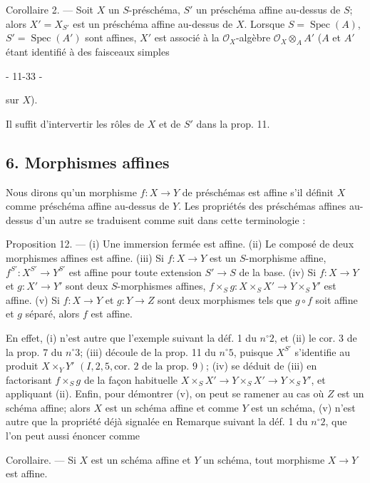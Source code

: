 Corollaire 2. — Soit $X$ un $S$-préschéma, $S'$ un préschéma affine au-dessus de $S$; alors $X' = X_{S'}$ est un préschéma affine au-dessus de $X$. Lorsque $S = \operatorname{Spec}(A)$, $S' = \operatorname{Spec}(A')$ sont affines, $X'$ est associé à la $\mathcal{O}_X$-algèbre $\mathcal{O}_X \otimes_A A'$ ($A$ et $A'$ étant identifié à des faisceaux simples

\newpage


- 11-33 -

sur $X$).

Il suffit d'intervertir les rôles de $X$ et de $S'$ dans la prop. 11.

\subsection*{6. Morphismes affines}

Nous dirons qu'un morphisme $f: X \to Y$ de préschémas est affine s'il définit $X$ comme préschéma affine au-dessus de $Y$. Les propriétés des préschémas affines au-dessus d'un autre se traduisent comme suit dans cette terminologie :

\noindent Proposition 12. --- (i) Une immersion fermée est affine.
(ii) Le composé de deux morphismes affines est affine.
(iii) Si $f: X \to Y$ est un $S$-morphisme affine, $f^{S'}: X^{S'} \to Y^{S'}$ est affine pour toute extension $S' \to S$ de la base.
(iv) Si $f: X \to Y$ et $g: X' \to Y'$ sont deux $S$-morphismes affines, $f \times_S g: X \times_S X' \to Y \times_S Y'$ est affine.
(v) Si $f: X \to Y$ et $g: Y \to Z$ sont deux morphismes tels que $g \circ f$ soit affine et $g$ séparé, alors $f$ est affine.

En effet, (i) n'est autre que l'exemple suivant la déf. 1 du $n^\circ 2$, et (ii) le cor. 3 de la prop. 7 du $n^\circ 3$; (iii) découle de la prop. 11 du $n^\circ 5$, puisque $X^{S'}$ s'identifie au produit $X \times_Y Y'$ $(I, 2, 5, \text{cor. } 2 \text{ de la prop. } 9)$; (iv) se déduit de (iii) en factorisant $f \times_S g$ de la façon habituelle $X \times_S X' \to Y \times_S X' \to Y \times_S Y'$, et appliquant (ii). Enfin, pour démontrer (v), on peut se ramener au cas où $Z$ est un schéma affine; alors $X$ est un schéma affine et comme $Y$ est un schéma, (v) n'est autre que la propriété déjà signalée en Remarque suivant la déf. 1 du $n^\circ 2$, que l'on peut aussi énoncer comme

\noindent Corollaire. --- Si $X$ est un schéma affine et $Y$ un schéma, tout morphisme $X \to Y$ est affine.

